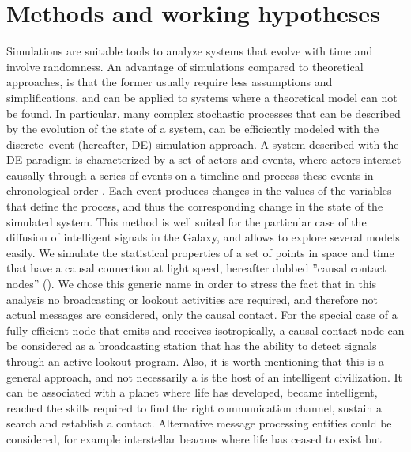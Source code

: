 

      

\section{Methods and working hypotheses}\label{S_methods}

Simulations are suitable tools to analyze systems that evolve with
time and involve randomness.
%
An advantage of simulations compared to theoretical approaches, is
that the former usually require less assumptions and simplifications,
and can be applied to systems where a theoretical model can not be
found.
%
In particular, many complex stochastic processes that can be described
by the evolution of the state of a system, can be efficiently modeled
with the discrete--event (hereafter, DE) simulation approach.
%
A system described with the DE paradigm is characterized by a set of
actors and events, where actors interact causally through a series of
events on a timeline and process these events in chronological order
\citep{ptolemaeus_system_2014, chung_simulation_2003,
ross_simulation_2012}.
%
Each event produces changes in the values of the variables that define
the process, and thus the corresponding change in the state of the
simulated system.
%
This method is well suited for the particular case of the diffusion of
intelligent signals in the Galaxy, and allows to explore several
models easily.
%
We simulate the statistical properties of a set of points in space and
time that have a causal connection
at light speed, hereafter dubbed ''causal contact nodes'' (\ceti{}).
%
%
We chose this generic name in order to stress the fact that in this
analysis no broadcasting or lookout activities are required, 
and therefore not actual messages are considered, only the causal
contact.
%
For the special case of a fully efficient node that emits
and receives isotropically, a causal contact node can be considered as
a broadcasting station that has the ability to detect signals through
an active lookout program.
%
Also, it is worth mentioning that this is a general approach, and not
necessarily a \ceti{} is the host of an intelligent civilization.
%
It can be associated with a planet where life has developed,
became intelligent, reached the skills required to find the right
communication channel, sustain a search and establish a contact.
%
Alternative message processing entities could be considered, for
example interstellar beacons where life has ceased to exist but
